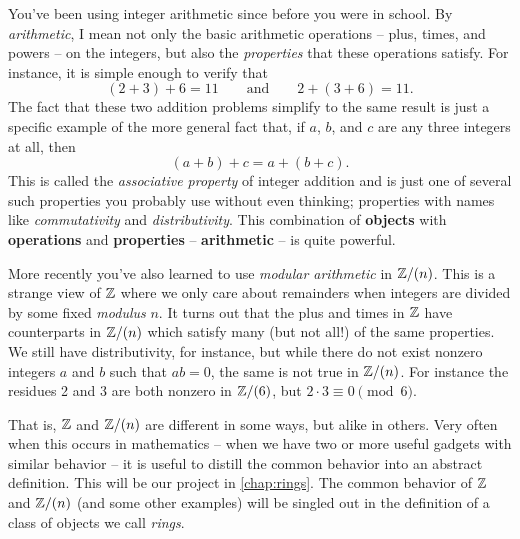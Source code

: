 You've been using integer arithmetic since before you were in school.
By \emph{arithmetic}, I mean not only the basic arithmetic operations -- plus, times, and powers -- on the integers, but also the \emph{properties} that these operations satisfy.
For instance, it is simple enough to verify that \[ (2 + 3) + 6 = 11 \quad\quad \mathrm{and} \quad\quad 2 + (3 + 6) = 11. \]
The fact that these two addition problems simplify to the same result is just a specific example of the more general fact that, if \(a\), \(b\), and \(c\) are any three integers at all, then \[ (a+b)+c = a+(b+c). \]
This is called the \emph{associative property} of integer addition and is just one of several such properties you probably use without even thinking; properties with names like \emph{commutativity} and \emph{distributivity}.
This combination of \textbf{objects} with \textbf{operations} and \textbf{properties} -- \textbf{arithmetic} -- is quite powerful.

More recently you've also learned to use \emph{modular arithmetic} in \(\mathbb{Z}/(n)\).
This is a strange view of \(\mathbb{Z}\) where we only care about remainders when integers are divided by some fixed \emph{modulus} \(n\).
It turns out that the plus and times in \(\mathbb{Z}\) have counterparts in \(\mathbb{Z}/(n)\) which satisfy many (but not all!) of the same properties.
We still have distributivity, for instance, but while there do not exist nonzero integers \(a\) and \(b\) such that \(ab = 0\), the same is not true in \(\mathbb{Z}/(n)\).
For instance the residues 2 and 3 are both nonzero in \(\mathbb{Z}/(6)\), but \(2 \cdot 3 \equiv 0 \pmod{6}\).

That is, \(\mathbb{Z}\) and \(\mathbb{Z}/(n)\) are different in some ways, but alike in others.
Very often when this occurs in mathematics -- when we have two or more useful gadgets with similar behavior -- it is useful to distill the common behavior into an abstract definition.
This will be our project in \autoref{chap:rings}.
The common behavior of \(\mathbb{Z}\) and \(\mathbb{Z}/(n)\) (and some other examples) will be singled out in the definition of a class of objects we call \emph{rings}.
